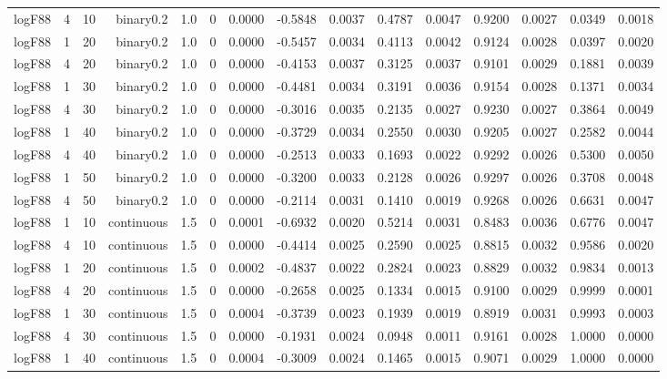 \begin{longtable}{rrrrrrrrrrrrrrr}
  logF88 & 4 & 10 & binary0.2 & 1.0 & 0 & 0.0000 & -0.5848 & 0.0037 & 0.4787 & 0.0047 & 0.9200 & 0.0027 & 0.0349 & 0.0018 \\ 
  logF88 & 1 & 20 & binary0.2 & 1.0 & 0 & 0.0000 & -0.5457 & 0.0034 & 0.4113 & 0.0042 & 0.9124 & 0.0028 & 0.0397 & 0.0020 \\ 
  logF88 & 4 & 20 & binary0.2 & 1.0 & 0 & 0.0000 & -0.4153 & 0.0037 & 0.3125 & 0.0037 & 0.9101 & 0.0029 & 0.1881 & 0.0039 \\ 
  logF88 & 1 & 30 & binary0.2 & 1.0 & 0 & 0.0000 & -0.4481 & 0.0034 & 0.3191 & 0.0036 & 0.9154 & 0.0028 & 0.1371 & 0.0034 \\ 
  logF88 & 4 & 30 & binary0.2 & 1.0 & 0 & 0.0000 & -0.3016 & 0.0035 & 0.2135 & 0.0027 & 0.9230 & 0.0027 & 0.3864 & 0.0049 \\ 
  logF88 & 1 & 40 & binary0.2 & 1.0 & 0 & 0.0000 & -0.3729 & 0.0034 & 0.2550 & 0.0030 & 0.9205 & 0.0027 & 0.2582 & 0.0044 \\ 
  logF88 & 4 & 40 & binary0.2 & 1.0 & 0 & 0.0000 & -0.2513 & 0.0033 & 0.1693 & 0.0022 & 0.9292 & 0.0026 & 0.5300 & 0.0050 \\ 
  logF88 & 1 & 50 & binary0.2 & 1.0 & 0 & 0.0000 & -0.3200 & 0.0033 & 0.2128 & 0.0026 & 0.9297 & 0.0026 & 0.3708 & 0.0048 \\ 
  logF88 & 4 & 50 & binary0.2 & 1.0 & 0 & 0.0000 & -0.2114 & 0.0031 & 0.1410 & 0.0019 & 0.9268 & 0.0026 & 0.6631 & 0.0047 \\ 
  logF88 & 1 & 10 & continuous & 1.5 & 0 & 0.0001 & -0.6932 & 0.0020 & 0.5214 & 0.0031 & 0.8483 & 0.0036 & 0.6776 & 0.0047 \\ 
  logF88 & 4 & 10 & continuous & 1.5 & 0 & 0.0000 & -0.4414 & 0.0025 & 0.2590 & 0.0025 & 0.8815 & 0.0032 & 0.9586 & 0.0020 \\ 
  logF88 & 1 & 20 & continuous & 1.5 & 0 & 0.0002 & -0.4837 & 0.0022 & 0.2824 & 0.0023 & 0.8829 & 0.0032 & 0.9834 & 0.0013 \\ 
  logF88 & 4 & 20 & continuous & 1.5 & 0 & 0.0000 & -0.2658 & 0.0025 & 0.1334 & 0.0015 & 0.9100 & 0.0029 & 0.9999 & 0.0001 \\ 
  logF88 & 1 & 30 & continuous & 1.5 & 0 & 0.0004 & -0.3739 & 0.0023 & 0.1939 & 0.0019 & 0.8919 & 0.0031 & 0.9993 & 0.0003 \\ 
  logF88 & 4 & 30 & continuous & 1.5 & 0 & 0.0000 & -0.1931 & 0.0024 & 0.0948 & 0.0011 & 0.9161 & 0.0028 & 1.0000 & 0.0000 \\ 
  logF88 & 1 & 40 & continuous & 1.5 & 0 & 0.0004 & -0.3009 & 0.0024 & 0.1465 & 0.0015 & 0.9071 & 0.0029 & 1.0000 & 0.0000 \\ 

\end{longtable}
